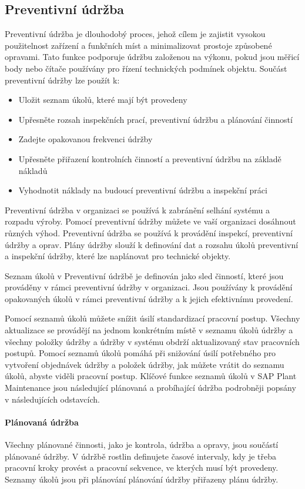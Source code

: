 \documentclass[thesis=M,czech]{FITthesis}[2012/06/26]
\begin{document}
\subsection{Preventivní údržba}
Preventivní údržba je dlouhodobý proces, jehož cílem je zajistit vysokou použitelnost zařízení a funkčních míst a minimalizovat prostoje způsobené opravami. Tato funkce podporuje údržbu založenou na výkonu, pokud jsou měřicí body nebo čítače používány pro řízení technických podmínek objektu.
Součást preventivní údržby lze použít k:
\begin{itemize}
	\item
	Uložit seznam úkolů, které mají být provedeny
	\item
	Upřesněte rozsah inspekčních prací, preventivní údržbu a plánování činností
	\item
	Zadejte opakovanou frekvenci údržby
	\item
	Upřesněte přiřazení kontrolních činností a preventivní údržbu na základě nákladů
	\item
	Vyhodnotit náklady na budoucí preventivní údržbu a inspekční práci
\end{itemize} 	

Preventivní údržba v organizaci se používá k zabránění selhání systému a rozpadu výroby. Pomocí preventivní údržby můžete ve vaší organizaci dosáhnout různých výhod. Preventivní údržba se používá k provádění inspekcí, preventivní údržby a oprav. Plány údržby slouží k definování dat a rozsahu úkolů preventivní a inspekční údržby, které lze naplánovat pro technické objekty.

Seznam úkolů v Preventivní údržbě je definován jako sled činností, které jsou prováděny v rámci preventivní údržby v organizaci. Jsou používány k provádění opakovaných úkolů v rámci preventivní údržby a k jejich efektivnímu provedení.

Pomocí seznamů úkolů můžete snížit úsilí standardizací pracovní postup. Všechny aktualizace se provádějí na jednom konkrétním místě v seznamu úkolů údržby a všechny položky údržby a údržby v systému obdrží aktualizovaný stav pracovních postupů. Pomocí seznamů úkolů pomáhá při snižování úsilí potřebného pro vytvoření objednávek údržby a položek údržby, jak můžete vrátit do seznamu úkolů, abyste viděli pracovní postup.
Klíčové funkce seznamů úkolů v SAP Plant Maintenance jsou následující plánovaná a probíhající údržba podrobněji popsány v následujících odstavcích.

\paragraph{Plánovaná údržba}
Všechny plánované činnosti, jako je kontrola, údržba a opravy, jsou součástí plánované údržby. V údržbě rostlin definujete časové intervaly, kdy je třeba pracovní kroky provést a pracovní sekvence, ve kterých musí být provedeny. Seznamy úkolů jsou při plánování plánování údržby přiřazeny plánu údržby.
\end{document}
